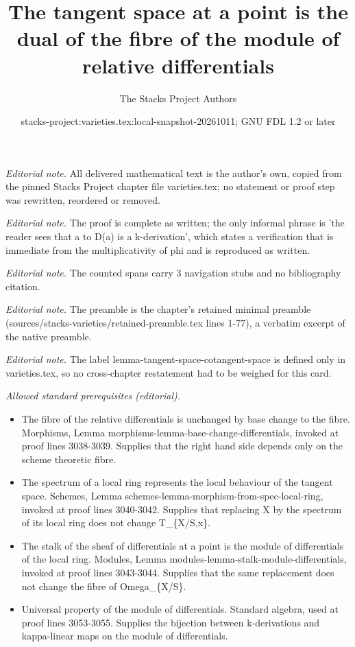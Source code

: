 \documentclass[10pt,a4paper]{amsart}
\title{The tangent space at a point is the dual of the fibre of the module of relative differentials}
\author{The Stacks Project Authors}
\date{stacks-project:varieties.tex:local-snapshot-20261011; GNU FDL 1.2 or later}
\theoremstyle{plain}
\theoremstyle{definition}
\theoremstyle{remark}
\numberwithin{equation}{subsection}
\begin{document}
\maketitle
\noindent\textit{Editorial note.} All delivered mathematical text is the author's own, copied from the pinned Stacks Project chapter file varieties.tex; no statement or proof step was rewritten, reordered or removed.\par\medskip
\noindent\textit{Editorial note.} The proof is complete as written; the only informal phrase is 'the reader sees that a to D(a) is a k-derivation', which states a verification that is immediate from the multiplicativity of phi and is reproduced as written.\par\medskip
\noindent\textit{Editorial note.} The counted spans carry 3 navigation stubs and no bibliography citation.\par\medskip
\noindent\textit{Editorial note.} The preamble is the chapter's retained minimal preamble (sources/stacks-varieties/retained-preamble.tex lines 1-77), a verbatim excerpt of the native preamble.\par\medskip
\noindent\textit{Editorial note.} The label lemma-tangent-space-cotangent-space is defined only in varieties.tex, so no cross-chapter restatement had to be weighed for this card.\par\medskip
\noindent\textit{Allowed standard prerequisites (editorial).}\begin{itemize}
\item The fibre of the relative differentials is unchanged by base change to the fibre. Morphisms, Lemma morphisms-lemma-base-change-differentials, invoked at proof lines 3038-3039. Supplies that the right hand side depends only on the scheme theoretic fibre.
\item The spectrum of a local ring represents the local behaviour of the tangent space. Schemes, Lemma schemes-lemma-morphism-from-spec-local-ring, invoked at proof lines 3040-3042. Supplies that replacing X by the spectrum of its local ring does not change T\_\{X/S,x\}.
\item The stalk of the sheaf of differentials at a point is the module of differentials of the local ring. Modules, Lemma modules-lemma-stalk-module-differentials, invoked at proof lines 3043-3044. Supplies that the same replacement does not change the fibre of Omega\_\{X/S\}.
\item Universal property of the module of differentials. Standard algebra, used at proof lines 3053-3055. Supplies the bijection between k-derivations and kappa-linear maps on the module of differentials.
\end{itemize}\medskip
\end{document}
